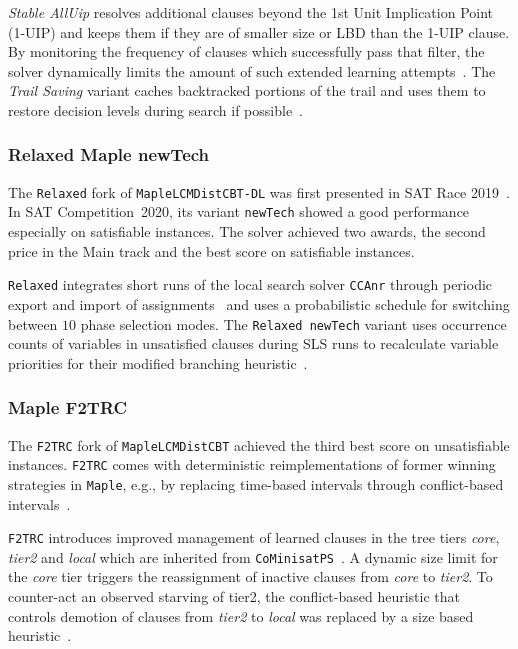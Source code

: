 \documentclass{elsarticle}
\newcommand{\solver}[1]{\texttt{#1}}
\begin{document}
\emph{Stable AllUip} resolves additional clauses beyond the 1st Unit Implication Point (1-UIP) and keeps them if they are of smaller size or LBD than the 1-UIP clause. 
By monitoring the frequency of clauses which successfully pass that filter, the solver dynamically limits the amount of such extended learning attempts~\cite{Zhang:2001:ClauseLearning,Bacchus:SC2020}.
The \emph{Trail Saving} variant caches backtracked portions of the trail and uses them to restore decision levels during search if possible~\cite{Hickey:2020:TrailSaving}. 


\subsubsection{Relaxed Maple newTech}

The \solver{Relaxed} fork of \solver{MapleLCMDistCBT-DL} was first presented in SAT Race 2019~\cite{Xindi:SC2019}. 
In SAT Competition~2020, its variant \solver{newTech} showed a good performance especially on satisfiable instances. 
The solver achieved two awards, the second price in the Main track and the best score on satisfiable instances. 

\solver{Relaxed} integrates short runs of the local search solver \solver{CCAnr} through periodic export and import of assignments~\cite{Xindi:SC2019} and uses a probabilistic schedule for switching between $10$ phase selection modes. 
The \solver{Relaxed newTech} variant uses occurrence counts of variables in unsatisfied clauses during SLS runs to recalculate variable priorities for their modified branching heuristic~\cite{Xindi:SC2020}. 


\subsubsection{Maple F2TRC}

The \solver{F2TRC} fork of \solver{MapleLCMDistCBT} achieved the third best score on unsatisfiable instances. 
\solver{F2TRC} comes with deterministic reimplementations of former winning strategies in \solver{Maple}, e.g., by replacing time-based intervals through conflict-based intervals~\cite{Kochemazov:SC2020}. 

\solver{F2TRC} introduces improved management of learned clauses in the tree tiers \emph{core}, \emph{tier2} and \emph{local} which are inherited from \solver{CoMinisatPS}~\cite{Oh:2015:satunsat}.
A dynamic size limit for the \emph{core} tier triggers the reassignment of inactive clauses from \emph{core} to \emph{tier2}. 
To counter-act an observed starving of tier2, the conflict-based heuristic that controls demotion of clauses from \emph{tier2} to \emph{local} was replaced by a size based heuristic~\cite{Kochemazov:SC2020}. 
\end{document}
